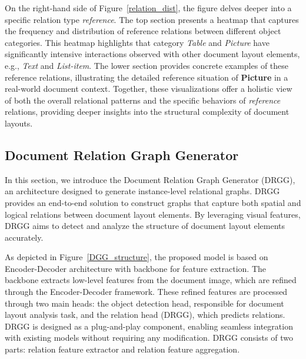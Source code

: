 On the right-hand side of Figure~\ref{relation_dist}, the figure delves deeper into a specific relation type \textit{reference}. The top section presents a heatmap that captures the frequency and distribution of reference relations between different object categories. This heatmap highlights that category \textit{Table} and \textit{Picture} have significantly intensive interactions observed with other document layout elements, e.g., \textit{Text} and \textit{List-item}. The lower section provides concrete examples of these reference relations, illustrating the detailed reference situation of \textbf{Picture} in a real-world document context. Together, these visualizations offer a holistic view of both the overall relational patterns and the specific behaviors of \textit{reference} relations, providing deeper insights into the structural complexity of document layouts.

\subsection{Document Relation Graph Generator}
\label{DRGG}
In this section, we introduce the Document Relation Graph Generator (DRGG), an architecture designed to generate instance-level relational graphs. DRGG provides an end-to-end solution to construct graphs that capture both spatial and logical relations between document layout elements. By leveraging visual features, DRGG aims to detect and analyze the structure of document layout elements accurately.



As depicted in Figure~\ref{DGG_structure}, the proposed model is based on Encoder-Decoder architecture with backbone for feature extraction. The backbone extracts low-level features from the document {image}, which are refined through the Encoder-Decoder framework. These refined features are processed through two main heads: the object detection head, responsible for {document layout analysis task}, and the relation head {(DRGG)}, which predicts relations. DRGG is designed as a plug-and-play component, enabling seamless integration with existing models without requiring any modification. DRGG consists of two parts: relation feature extractor and relation feature aggregation. 

